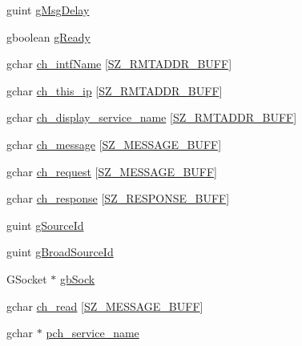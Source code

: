 \begin{DoxyCompactItemize}
\item 
guint \hyperlink{struct__control_data_a277ea878a8491fa38269b6c762a05389}{g\+Msg\+Delay}
\item 
gboolean \hyperlink{struct__control_data_a04238362a20b6616913d869fc464e4b2}{g\+Ready}
\item 
gchar \hyperlink{struct__control_data_adac6cf5482e4bbabb442f8ab27e4bc62}{ch\+\_\+intf\+Name} \mbox{[}\hyperlink{gtk_d_s_8c_a152ca8fa1a2eac39d1badafb6c6cef8c}{S\+Z\+\_\+\+R\+M\+T\+A\+D\+D\+R\+\_\+\+B\+U\+FF}\mbox{]}
\item 
gchar \hyperlink{struct__control_data_ac48fc4263dd4a6bad484b93fbf1ffe1b}{ch\+\_\+this\+\_\+ip} \mbox{[}\hyperlink{gtk_d_s_8c_a152ca8fa1a2eac39d1badafb6c6cef8c}{S\+Z\+\_\+\+R\+M\+T\+A\+D\+D\+R\+\_\+\+B\+U\+FF}\mbox{]}
\item 
gchar \hyperlink{struct__control_data_a94aa04264eafaa65a7a869a540bbdf93}{ch\+\_\+display\+\_\+service\+\_\+name} \mbox{[}\hyperlink{gtk_d_s_8c_a152ca8fa1a2eac39d1badafb6c6cef8c}{S\+Z\+\_\+\+R\+M\+T\+A\+D\+D\+R\+\_\+\+B\+U\+FF}\mbox{]}
\item 
gchar \hyperlink{struct__control_data_a16162d5fe851704d7ea50ff16525b94c}{ch\+\_\+message} \mbox{[}\hyperlink{gtk_d_s_8c_ab5903aa853c3769389e570c8490feb1e}{S\+Z\+\_\+\+M\+E\+S\+S\+A\+G\+E\+\_\+\+B\+U\+FF}\mbox{]}
\item 
gchar \hyperlink{struct__control_data_a948c37bbe26f5bdd4841b65384155edf}{ch\+\_\+request} \mbox{[}\hyperlink{gtk_d_s_8c_ab5903aa853c3769389e570c8490feb1e}{S\+Z\+\_\+\+M\+E\+S\+S\+A\+G\+E\+\_\+\+B\+U\+FF}\mbox{]}
\item 
gchar \hyperlink{struct__control_data_a9423e8582b05e2dde58b7302bee5559b}{ch\+\_\+response} \mbox{[}\hyperlink{gtk_d_s_8c_a3c73a8961a16a0dfbb87b5a7317bacd2}{S\+Z\+\_\+\+R\+E\+S\+P\+O\+N\+S\+E\+\_\+\+B\+U\+FF}\mbox{]}
\item 
guint \hyperlink{struct__control_data_a719187f5c3c94da5aa08616db7820b98}{g\+Source\+Id}
\item 
guint \hyperlink{struct__control_data_ae9e5e76959a76812d94ee8f83ae2eef5}{g\+Broad\+Source\+Id}
\item 
G\+Socket $\ast$ \hyperlink{struct__control_data_a3023250e01849cb311a7207746a3b64e}{gb\+Sock}
\item 
gchar \hyperlink{struct__control_data_a243b075becb92f2f37f56f60f738efb1}{ch\+\_\+read} \mbox{[}\hyperlink{gtk_d_s_8c_ab5903aa853c3769389e570c8490feb1e}{S\+Z\+\_\+\+M\+E\+S\+S\+A\+G\+E\+\_\+\+B\+U\+FF}\mbox{]}
\item 
gchar $\ast$ \hyperlink{struct__control_data_a2197fd3d9315510193866dbedbd3cc8b}{pch\+\_\+service\+\_\+name}

\end{DoxyCompactItemize}
